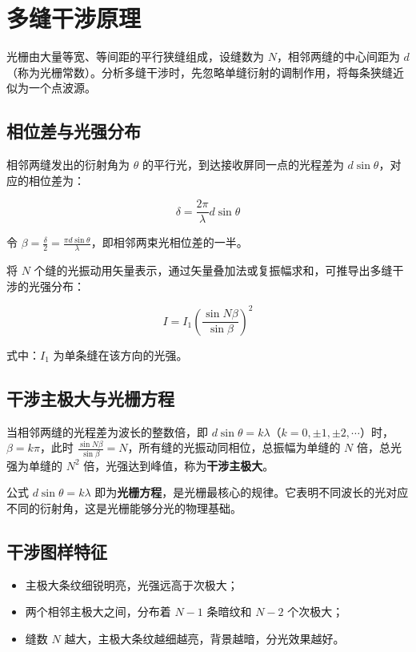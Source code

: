 \documentclass[12pt,a4paper]{ctexrep}
\begin{document}
\section{多缝干涉原理}

光栅由大量等宽、等间距的平行狭缝组成，设缝数为 $N$，相邻两缝的中心间距为 $d$（称为光栅常数）。分析多缝干涉时，先忽略单缝衍射的调制作用，将每条狭缝近似为一个点波源。

\subsection{相位差与光强分布}

相邻两缝发出的衍射角为 $\theta$ 的平行光，到达接收屏同一点的光程差为 $d\sin \theta$，对应的相位差为：

\begin{equation*}
\delta=\frac{2\pi}{\lambda}d\sin \theta
\end{equation*}

令 $\beta=\frac{\delta}{2}=\frac{\pi d\sin \theta}{\lambda}$，即相邻两束光相位差的一半。

将 $N$ 个缝的光振动用矢量表示，通过矢量叠加法或复振幅求和，可推导出多缝干涉的光强分布：

\begin{equation*}
I={I}_{1}{\left( \frac{\sin N\beta}{\sin{\beta}} \right)}^{2}
\end{equation*}

式中：${I}_{1}$ 为单条缝在该方向的光强。

\subsection{干涉主极大与光栅方程}

当相邻两缝的光程差为波长的整数倍，即 $d\sin \theta=k\lambda$（$k=0,\pm1,\pm2,\cdots$）时，$\beta=k\pi$，此时 $\frac{\sin N\beta}{\sin{\beta}}=N$，所有缝的光振动同相位，总振幅为单缝的 $N$ 倍，总光强为单缝的 ${N}^{2}$ 倍，光强达到峰值，称为\textbf{干涉主极大}。

公式 $d\sin \theta=k\lambda$ 即为\textbf{光栅方程}，是光栅最核心的规律。它表明不同波长的光对应不同的衍射角，这是光栅能够分光的物理基础。

\subsection{干涉图样特征}

\begin{itemize}[leftmargin=2em, itemsep=2pt]
\item 主极大条纹细锐明亮，光强远高于次极大；
\item 两个相邻主极大之间，分布着 $N-1$ 条暗纹和 $N-2$ 个次极大；
\item 缝数 $N$ 越大，主极大条纹越细越亮，背景越暗，分光效果越好。
\end{itemize}
\end{document}
